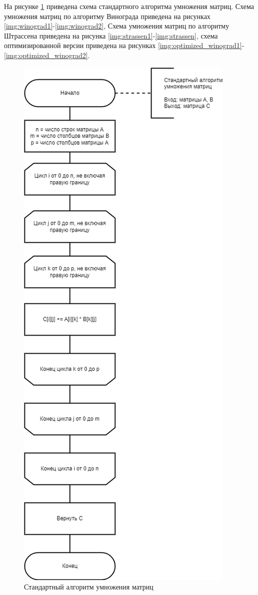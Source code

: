 На рисунке \ref{img:standard} приведена схема стандартного алгоритма умножения матриц. 
Схема умножения матриц по алгоритму Винограда приведена на рисунках \ref{img:winograd1}-\ref{img:winograd2},
Схема умножения матриц по алгоритму Штрассена приведена на рисунка \ref{img:strassen1}-\ref{img:strassen}, схема оптимизированной версии приведена на рисунках \ref{img:optimized_winograd1}-\ref{img:optimized_winograd2}.
\begin{figure}[H]
	\begin{center}
		\includegraphics[scale=0.6]{img/standard.png}
	\end{center}
	\captionsetup{justification=centering}
	\caption{Стандартный алгоритм умножения матриц}
	\label{img:standard}
\end{figure}

